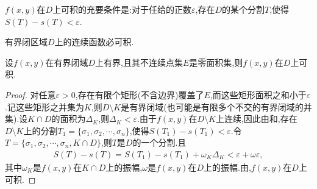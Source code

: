 \documentclass[../../main.tex]{subfiles}%
\begin{document}
\begin{theorem}\label{theorem:数分--定理21.5}
$f(x,y)$在$D$上可积的充要条件是:对于任给的正数$\varepsilon$,存在$D$的某个分割$T$,使得$S(T) - s(T) < \varepsilon$.
\end{theorem}

\begin{theorem}\label{theorem:数分--定理21.6}
有界闭区域$D$上的连续函数必可积.
\end{theorem}

\begin{theorem}
设$f(x,y)$在有界闭域$D$上有界,且其不连续点集$E$是零面积集,则$f(x,y)$在$D$上可积.
\end{theorem}
\begin{proof}
对任意$\varepsilon > 0$,存在有限个矩形(不含边界)覆盖了$E$,而这些矩形面积之和小于$\varepsilon$.记这些矩形之并集为$K$,则$D \setminus K$是有界闭域(也可能是有限多个不交的有界闭域的并集).设$K \cap D$的面积为$\Delta_K$,则$\Delta_K < \varepsilon$.由于$f(x,y)$在$D \setminus K$上连续,因此由和,存在$D \setminus K$上的分割$T_1 = \{ \sigma_1,\sigma_2,\cdots,\sigma_n \}$,使得$S(T_1) - s(T_1) < \varepsilon$.令$T = \{ \sigma_1,\sigma_2,\cdots,\sigma_n,K \cap D \}$,则$T$是$D$的一个分割.且
\begin{align*}
S(T) - s(T) = S(T_1) - s(T_1) + \omega_K \Delta_K < \varepsilon + \omega \varepsilon,
\end{align*}
其中$\omega_K$是$f(x,y)$在$K \cap D$上的振幅,$\omega$是$f(x,y)$在$D$上的振幅.由,$f(x,y)$在$D$上可积.
\end{proof}
\end{document}
